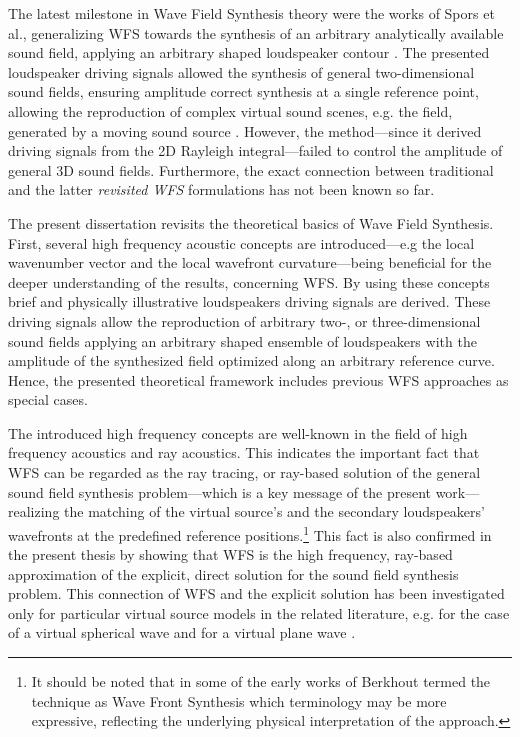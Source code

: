 The latest milestone in Wave Field Synthesis theory were the works of Spors et al., generalizing WFS towards the synthesis of an arbitrary analytically available sound field, applying an arbitrary shaped loudspeaker contour \cite{Rabenstein2007, Spors2008:WFSrevisited}.
The presented loudspeaker driving signals allowed the synthesis of general two-dimensional sound fields, ensuring amplitude correct synthesis at a single reference point,
allowing the reproduction of complex virtual sound scenes, e.g. the field, generated by a moving sound source \cite{Ahrens2008moving, Ahrens2008moving_b, Ahrens2011_moving_source_WFS}.
However, the method---since it derived driving signals from the 2D Rayleigh integral---failed to control the amplitude of general 3D sound fields.
Furthermore, the exact connection between traditional and the latter \emph{revisited WFS} formulations has not been known so far.

\vspace{3mm}
The present dissertation revisits the theoretical basics of Wave Field Synthesis.
First, several high frequency acoustic concepts are introduced---e.g the local wavenumber vector and the local wavefront curvature---being beneficial for the deeper understanding of the results, concerning WFS.
By using these concepts brief and physically illustrative loudspeakers driving signals are derived.
These driving signals allow the reproduction of arbitrary two-, or three-dimensional sound fields applying an arbitrary shaped ensemble of loudspeakers with the amplitude of the synthesized field optimized along an arbitrary reference curve.
Hence, the presented theoretical framework includes previous WFS approaches as special cases.

The introduced high frequency concepts are well-known in the field of high frequency acoustics and ray acoustics.
This indicates the important fact that WFS can be regarded as the ray tracing, or ray-based solution of the general sound field synthesis problem---which is a key message of the present work---realizing the matching of the virtual source's and the secondary loudspeakers' wavefronts at the predefined reference positions.\footnote{It should be noted that in some of the early works of Berkhout termed the technique as Wave Front Synthesis \cite{berkhout1992wave, doi:10.1121/1.404755} which terminology may be more expressive, reflecting the underlying physical interpretation of the approach.}
This fact is also confirmed in the present thesis by showing that WFS is the high frequency, ray-based approximation of the explicit, direct solution for the sound field synthesis problem.
This connection of WFS and the explicit solution has been investigated only for particular virtual source models in the related literature, e.g. for the case of a virtual spherical wave \cite{Spors2010:analysis_and_improvement} and for a virtual plane wave \cite{Schultz2016:DAGA}.

